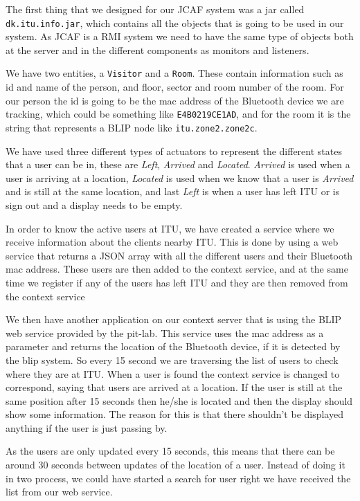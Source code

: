 \documentclass{ubicomp2011}
\begin{document}
The first thing that we designed for our JCAF system was a jar called \texttt{dk.itu.info.jar}, which contains all the objects that is going to be used in our system. As JCAF is a RMI system we need to have the same type of objects both at the server and in the different components as monitors and listeners.

We have two entities, a \texttt{Visitor} and a \texttt{Room}. These contain information such as id and name of the person, and floor, sector and room number of the room. For our person the id is going to be the mac address of the Bluetooth device we are tracking, which could be something like \texttt{E4B0219CE1AD}, and for the room it is the string that represents a BLIP node like \texttt{itu.zone2.zone2c}.

We have used three different types of actuators to represent the different states that a user can be in, these are \textit{Left}, \textit{Arrived} and \textit{Located}. \textit{Arrived} is used when a user is arriving at a location, \textit{Located} is used when we know that a user is \textit{Arrived} and is still at the same location, and last \textit{Left} is when a user has left ITU or is sign out and a display needs to be empty.

In order to know the active users at ITU, we have created a service where we receive information about the clients nearby ITU. This is done by using a web service that returns a JSON array with all the different users and their Bluetooth mac address. These users are then added to the context service, and at the same time we register if any of the users has left ITU and they are then removed from the context service

We then have another application on our context server that is using the BLIP web service provided by the pit-lab. This service uses the mac address as a parameter and returns the location of the Bluetooth device, if it is detected by the blip system. So every 15 second we are traversing the list of users to check where they are at ITU. When a user is found the context service is changed to correspond, saying that users are arrived at a location. If the user is still at the same position after 15 seconds then he/she is located and then the display should show some information. The reason for this is that there shouldn’t be displayed anything if the user is just passing by.

As the users are only updated every 15 seconds, this means that there can be around 30 seconds between updates of the location of a user. Instead of doing it in two process, we could have started a search for user right we have received the list from our web service.
\end{document}
